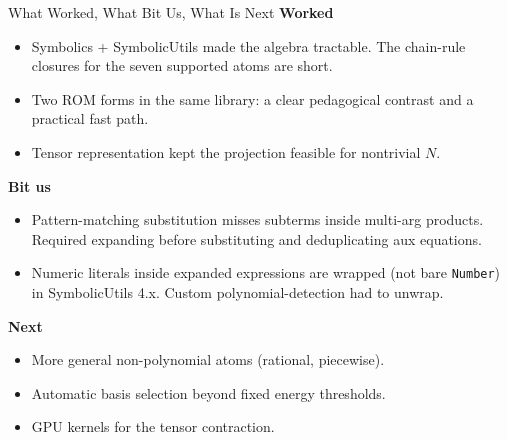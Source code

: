 \documentclass[aspectratio=169,10pt]{beamer}
\begin{document}
\begin{frame}{What Worked, What Bit Us, What Is Next}
  \textbf{Worked}
  \begin{itemize}\setlength\itemsep{0pt}
    \item Symbolics + SymbolicUtils made the algebra tractable. The chain-rule closures for the seven supported atoms are short.
    \item Two ROM forms in the same library: a clear pedagogical contrast and a practical fast path.
    \item Tensor representation kept the projection feasible for nontrivial $N$.
  \end{itemize}

  \medskip
  \textbf{Bit us}
  \begin{itemize}\setlength\itemsep{0pt}
    \item Pattern-matching substitution misses subterms inside multi-arg products. Required expanding before substituting and deduplicating aux equations.
    \item Numeric literals inside expanded expressions are wrapped (not bare \texttt{Number}) in SymbolicUtils 4.x. Custom polynomial-detection had to unwrap.
  \end{itemize}

  \medskip
  \textbf{Next}
  \begin{itemize}\setlength\itemsep{0pt}
    \item More general non-polynomial atoms (rational, piecewise).
    \item Automatic basis selection beyond fixed energy thresholds.
    \item GPU kernels for the tensor contraction.
  \end{itemize}
\end{frame}
\end{document}
